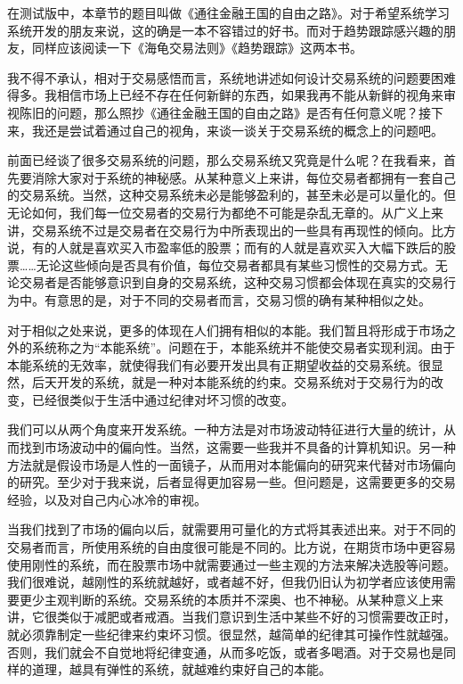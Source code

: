 在测试版中，本章节的题目叫做《通往金融王国的自由之路》。对于希望系统学习系统开发的朋友来说，这的确是一本不容错过的好书。而对于趋势跟踪感兴趣的朋友，同样应该阅读一下《海龟交易法则》《趋势跟踪》这两本书。

我不得不承认，相对于交易感悟而言，系统地讲述如何设计交易系统的问题要困难得多。我相信市场上已经不存在任何新鲜的东西，如果我再不能从新鲜的视角来审视陈旧的问题，那么照抄《通往金融王国的自由之路》是否有任何意义呢？接下来，我还是尝试着通过自己的视角，来谈一谈关于交易系统的概念上的问题吧。

前面已经谈了很多交易系统的问题，那么交易系统又究竟是什么呢？在我看来，首先要消除大家对于系统的神秘感。从某种意义上来讲，每位交易者都拥有一套自己的交易系统。当然，这种交易系统未必是能够盈利的，甚至未必是可以量化的。但无论如何，我们每一位交易者的交易行为都绝不可能是杂乱无章的。从广义上来讲，交易系统不过是交易者在交易行为中所表现出的一些具有再现性的倾向。比方说，有的人就是喜欢买入市盈率低的股票；而有的人就是喜欢买入大幅下跌后的股票……无论这些倾向是否具有价值，每位交易者都具有某些习惯性的交易方式。无论交易者是否能够意识到自身的交易系统，这种交易习惯都会体现在真实的交易行为中。有意思的是，对于不同的交易者而言，交易习惯的确有某种相似之处。

对于相似之处来说，更多的体现在人们拥有相似的本能。我们暂且将形成于市场之外的系统称之为“本能系统”。问题在于，本能系统并不能使交易者实现利润。由于本能系统的无效率，就使得我们有必要开发出具有正期望收益的交易系统。很显然，后天开发的系统，就是一种对本能系统的约束。交易系统对于交易行为的改变，已经很类似于生活中通过纪律对坏习惯的改变。

我们可以从两个角度来开发系统。一种方法是对市场波动特征进行大量的统计，从而找到市场波动中的偏向性。当然，这需要一些我并不具备的计算机知识。另一种方法就是假设市场是人性的一面镜子，从而用对本能偏向的研究来代替对市场偏向的研究。至少对于我来说，后者显得更加容易一些。但问题是，这需要更多的交易经验，以及对自己内心冰冷的审视。

当我们找到了市场的偏向以后，就需要用可量化的方式将其表述出来。对于不同的交易者而言，所使用系统的自由度很可能是不同的。比方说，在期货市场中更容易使用刚性的系统，而在股票市场中就需要通过一些主观的方法来解决选股等问题。我们很难说，越刚性的系统就越好，或者越不好，但我仍旧认为初学者应该使用需要更少主观判断的系统。交易系统的本质并不深奥、也不神秘。从某种意义上来讲，它很类似于减肥或者戒酒。当我们意识到生活中某些不好的习惯需要改正时，就必须靠制定一些纪律来约束坏习惯。很显然，越简单的纪律其可操作性就越强。否则，我们就会不自觉地将纪律变通，从而多吃饭，或者多喝酒。对于交易也是同样的道理，越具有弹性的系统，就越难约束好自己的本能。

